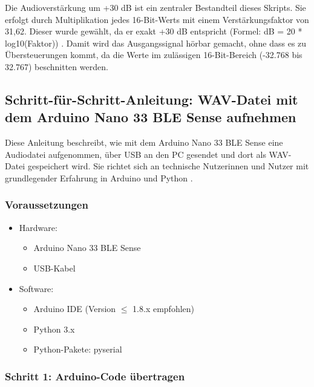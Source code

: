 Die Audioverstärkung um +30 dB ist ein zentraler Bestandteil dieses Skripts. Sie erfolgt durch Multiplikation jedes 16-Bit-Werts mit einem Verstärkungsfaktor von 31,62. Dieser wurde gewählt, da er exakt +30 dB entspricht (Formel: dB = 20 * log10(Faktor)) \cite{Weinzierl:2020a}. Damit wird das Ausgangssignal hörbar gemacht, ohne dass es zu Übersteuerungen kommt, da die Werte im zulässigen 16-Bit-Bereich (-32.768 bis 32.767) beschnitten werden.


\subsection{Schritt-für-Schritt-Anleitung: WAV-Datei mit dem Arduino Nano 33 BLE Sense aufnehmen}

Diese Anleitung beschreibt, wie mit dem Arduino Nano 33 BLE Sense eine Audiodatei aufgenommen, über USB an den PC gesendet und dort als WAV-Datei gespeichert wird. Sie richtet sich an technische Nutzerinnen und Nutzer mit grundlegender Erfahrung in Arduino und Python \cite{Warden:2019}.

\subsubsection{Voraussetzungen}
\begin{itemize}
    \item Hardware:
    \begin{itemize}
        \item Arduino Nano 33 BLE Sense
        
        \item USB-Kabel
    \end{itemize}
    
    \item Software:
    \begin{itemize}
        \item Arduino IDE (Version $\leq$ 1.8.x empfohlen)
        
        \item Python 3.x
        
        \item Python-Pakete: pyserial \cite{PySerial:2025}
    \end{itemize}
\end{itemize}


\subsubsection{Schritt 1: Arduino-Code übertragen}


